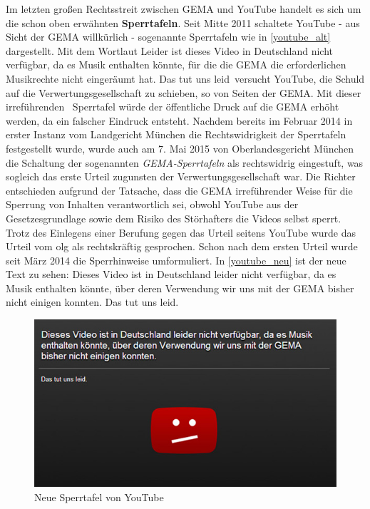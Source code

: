 Im letzten großen Rechtsstreit zwischen GEMA und YouTube handelt es sich um die schon oben erwähnten \textbf{Sperrtafeln}. Seit Mitte 2011 schaltete YouTube - aus Sicht der GEMA willkürlich - sogenannte Sperrtafeln wie in \vref{youtube_alt} dargestellt. Mit dem Wortlaut \glqq Leider ist dieses Video in Deutschland nicht verfügbar, da es Musik enthalten könnte, für die die GEMA die erforderlichen Musikrechte nicht eingeräumt hat. Das tut  uns leid\grqq~versucht YouTube, die Schuld auf die Verwertungsgesellschaft zu schieben, so von Seiten der GEMA. Mit dieser \glqq irreführenden\grqq~ Sperrtafel würde der öffentliche Druck auf die GEMA erhöht werden, da ein falscher Eindruck entsteht. Nachdem bereits im Februar 2014 in erster Instanz vom Landgericht München die Rechtswidrigkeit der Sperrtafeln festgestellt wurde, wurde auch am 7. Mai 2015 von Oberlandesgericht München die Schaltung der sogenannten \textit{GEMA-Sperrtafeln} als rechtswidrig eingestuft, was sogleich das erste Urteil zugunsten der Verwertungsgesellschaft war. Die Richter entschieden aufgrund der Tatsache, dass die GEMA irreführender Weise für die Sperrung von Inhalten verantwortlich sei, obwohl YouTube aus der Gesetzesgrundlage sowie dem Risiko des Störhafters die Videos selbst sperrt. Trotz des Einlegens einer Berufung gegen das Urteil seitens YouTube wurde das Urteil vom \gls{olg} als rechtskräftig gesprochen. Schon nach dem ersten Urteil wurde seit März 2014 die Sperrhinweise umformuliert. In \vref{youtube_neu} ist der neue Text zu sehen: \glqq Dieses Video ist in Deutschland leider nicht verfügbar, da es Musik enthalten könnte, über deren Verwendung wir uns mit der GEMA bisher nicht einigen konnten. Das tut uns leid.\grqq{}

\begin{figure}[H]
\centering
\includegraphics[scale=0.73]{se-wa-jpg/youtube_zeit}
\caption[Neue Sperrtafel von YouTube]{Neue Sperrtafel von YouTube\protect\footnotemark}
\label{youtube_neu}
\end{figure}


